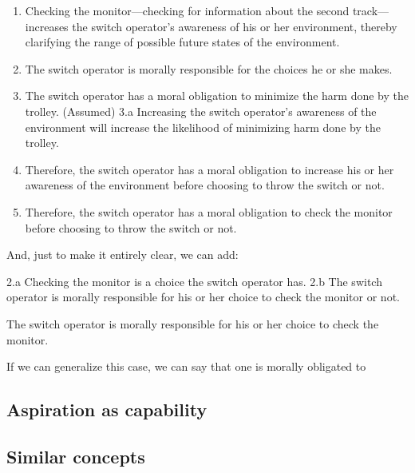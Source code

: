 \begin{enumerate}
\item Checking the monitor---checking for information about the second track---increases the switch operator's awareness of his or her environment, thereby clarifying the range of possible future states of the environment.

\item The switch operator is morally responsible for the choices he or she makes.

\item The switch operator has a moral obligation to minimize the harm done by the trolley. (Assumed)
3.a Increasing the switch operator's awareness of the environment will increase the likelihood of minimizing harm done by the trolley.

\item Therefore, the switch operator has a moral obligation to increase his or her awareness of the environment before choosing to throw the switch or not. 

\item Therefore, the switch operator has a moral obligation to check the monitor before choosing to throw the switch or not.

\end{enumerate}

And, just to make it entirely clear, we can add:

2.a Checking the monitor is a choice the switch operator has.
2.b The switch operator is morally responsible for his or her choice to check the monitor or not.

The switch operator is morally responsible for his or her choice to check the monitor.

If we can generalize this case, we can say that one is morally obligated to 

\subsection{Aspiration as capability}
\label{aspirationascapability}

\subsection{Similar concepts}
\label{similarconcepts}

